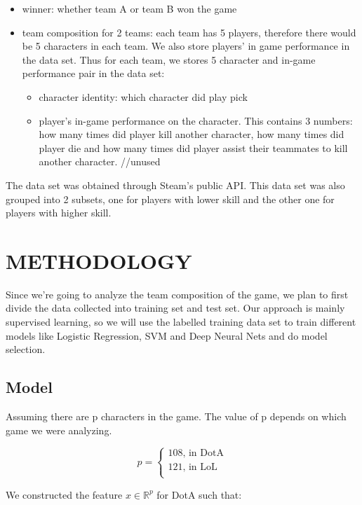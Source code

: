 \documentclass[conference]{IEEEtran}
\begin{document}
\begin{itemize}
\item winner: whether team A or team B won the game
\item team composition for 2 teams: each team has 5 players, therefore there would be 5 characters in each team. We also store players' in game performance in the data set. Thus for each team, we stores 5 character and in-game performance pair in the data set:
	\begin{itemize}
	\item character identity: which character did play pick
	\item player's in-game performance on the character. This contains 3 numbers: how many times did player kill another character, how many times did player die and how many times did player assist their teammates to kill another character. //unused
	\end{itemize}
\end{itemize}
The data set was obtained through Steam's public API. This data set was also grouped into 2 subsets, one for players with lower skill and the other one for players with higher skill.

\section{METHODOLOGY}
Since we're going to analyze the team composition of the game, we plan to first divide the data collected into training set and test set. Our approach is mainly supervised learning, so we will use the labelled training data set to train different models like Logistic Regression, SVM and Deep Neural Nets and do model selection. 

\subsection{Model}
Assuming there are p characters in the game. The value of p depends on which game we were analyzing. 

\begin{equation}
p = 
\begin{cases}
108 \text{,    in DotA} \\
121 \text{,    in LoL} \\
\end{cases}
\end{equation}

We constructed the feature $x \in \mathbb{R}^p$ for DotA such that:
\end{document}
